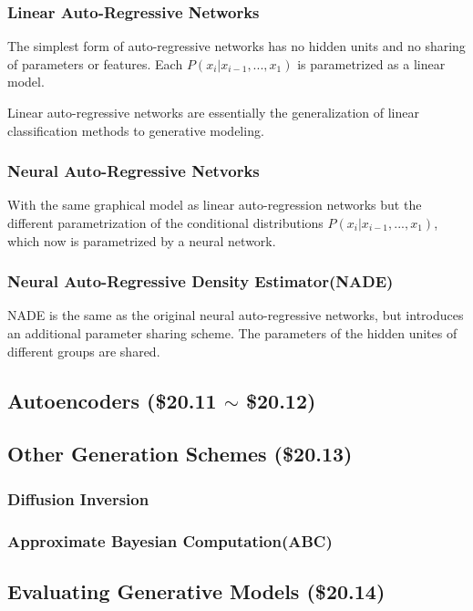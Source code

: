 \documentclass[12pt]{article}
\numberwithin{equation}{section}
\begin{document}
\subsubsection{Linear Auto-Regressive Networks}
	The simplest form of auto-regressive networks has no hidden units and no sharing of parameters or features. Each $P(x_i|x_{i-1},...,x_1)$ is parametrized as a linear model. \par
	Linear auto-regressive networks are essentially the generalization of linear classification methods to generative modeling. \par
\subsubsection{Neural Auto-Regressive Netvorks}
	With the same graphical model as linear auto-regression networks but the different parametrization of the conditional distributions $P(x_i|x_{i-1},...,x_1)$, which now is parametrized by a neural network. \par
\subsubsection{Neural Auto-Regressive Density Estimator(NADE)}
	NADE is the same as the original neural auto-regressive networks, but introduces an additional parameter sharing scheme. The parameters of the hidden unites of different groups are shared.\par
\subsection{Autoencoders (\$20.11 $\sim$ \$20.12)}
\subsection{Other Generation Schemes (\$20.13)}
\subsubsection{Diffusion Inversion}
\subsubsection{Approximate Bayesian Computation(ABC)}
\subsection{Evaluating Generative Models (\$20.14)}
\end{document}
